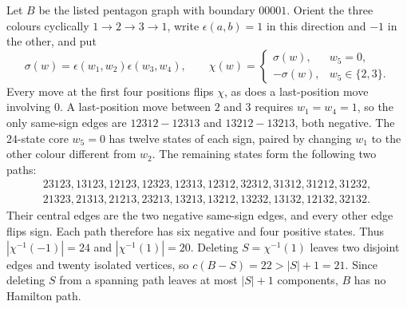 Let $B$ be the listed pentagon graph with boundary $00001$.
Orient the three colours cyclically $1\to2\to3\to1$, write
$\epsilon(a,b)=1$ in this direction and $-1$ in the other, and put
\[
 \sigma(w)=\epsilon(w_1,w_2)\epsilon(w_3,w_4),\qquad
 \chi(w)=\begin{cases}\sigma(w),&w_5=0,\\-\sigma(w),&w_5\in\{2,3\}.
 \end{cases}
\]
Every move at the first four positions flips $\chi$, as does a last-position
move involving $0$. A last-position move between $2$ and $3$ requires
$w_1=w_4=1$, so the only same-sign edges are
$12312\!-12313$ and $13212\!-13213$, both negative.
The $24$-state core $w_5=0$ has twelve states of each sign, paired by changing
$w_1$ to the other colour different from $w_2$.
The remaining states form the following two paths:
\[
\begin{array}{l}
23123,13123,12123,12323,12313,12312,32312,31312,31212,31232,\\
21323,21313,21213,23213,13213,13212,13232,13132,12132,32132.
\end{array}
\]
Their central edges are the two negative same-sign edges, and every other
edge flips sign. Each path therefore has six negative and four positive
states. Thus $|\chi^{-1}(-1)|=24$ and $|\chi^{-1}(1)|=20$.
Deleting $S=\chi^{-1}(1)$ leaves two disjoint edges and twenty isolated
vertices, so $c(B-S)=22>|S|+1=21$. Since deleting $S$ from a spanning path
leaves at most $|S|+1$ components, $B$ has no Hamilton path.
